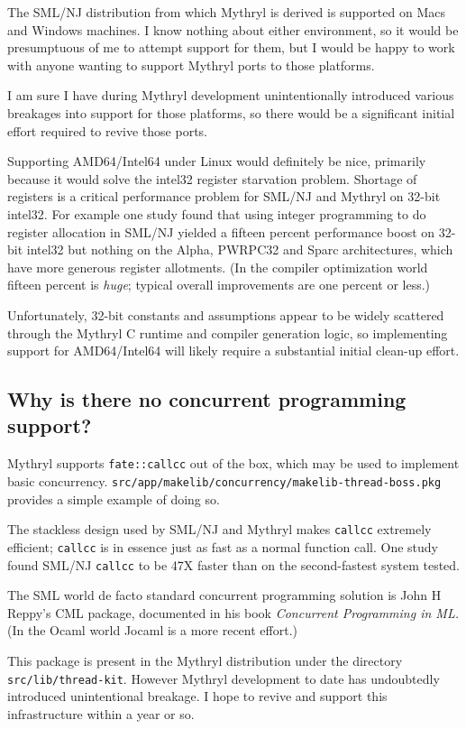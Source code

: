 The SML/NJ distribution from which Mythryl is derived is supported on 
Macs and Windows machines.  I know nothing about either environment, 
so it would be presumptuous of me to attempt support for them, but I 
would be happy to work with anyone wanting to support Mythryl ports 
to those platforms.

I am sure I have during Mythryl development unintentionally introduced 
various breakages into support for those platforms, so there would be 
a significant initial effort required to revive those ports.

Supporting AMD64/Intel64 under Linux would definitely be nice, 
primarily because it would solve the intel32 register starvation problem. 
Shortage of registers is a critical performance problem for SML/NJ and 
Mythryl on 32-bit intel32.  For example one study found that using integer 
programming to do register allocation in SML/NJ yielded a fifteen 
percent performance boost on 32-bit intel32 but nothing on the Alpha, PWRPC32 
and Sparc architectures, which have more generous register allotments. 
(In the compiler optimization world fifteen percent is {\it huge}; 
typical overall improvements are one percent or less.)

Unfortunately, 32-bit constants and assumptions appear to be widely 
scattered through the Mythryl C runtime and compiler generation logic, 
so implementing support for AMD64/Intel64 will likely require a 
substantial initial clean-up effort.


\subsection{Why is there no concurrent programming support?}

Mythryl supports {\tt fate::callcc} out of the box, which may be used 
to implement basic concurrency.  {\tt src/app/makelib/concurrency/makelib-thread-boss.pkg} 
provides a simple example of doing so.

The stackless design used by SML/NJ and Mythryl makes {\tt callcc} 
extremely efficient; {\tt callcc} is in essence just as fast as a 
normal function call.  One study found SML/NJ {\tt callcc} to be 47X 
faster than on the second-fastest system tested.

The SML world de facto standard concurrent programming solution is John 
H Reppy's CML package, documented in his book {\it Concurrent Programming 
in ML.}  (In the Ocaml world Jocaml is a more recent effort.)

This package is present in the Mythryl distribution under the directory 
{\tt src/lib/thread-kit}.  However Mythryl development to date has 
undoubtedly introduced unintentional breakage.  I hope to revive and 
support this infrastructure within a year or so.

